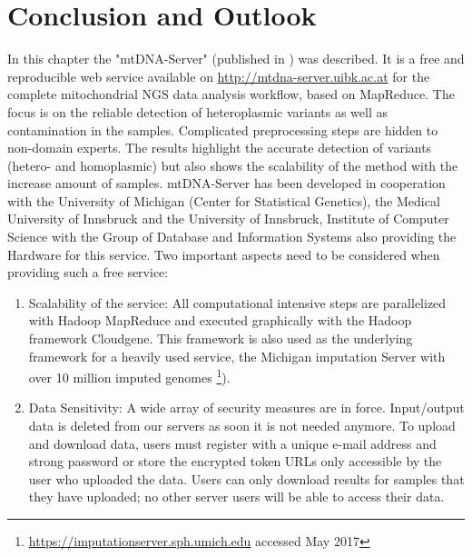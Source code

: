\section{Conclusion and Outlook}
In this chapter the "mtDNA-Server" (published in \cite{Weissensteiner2016b}) was described. It is a free and reproducible web service available on \url{http://mtdna-server.uibk.ac.at} for the complete mitochondrial NGS data analysis workflow, based on MapReduce. The focus is on the reliable detection of heteroplasmic variants as well as contamination in the samples. Complicated preprocessing steps are hidden to non-domain experts. The results highlight the accurate detection of variants (hetero- and homoplasmic) but also shows the scalability of the method with the increase amount of samples. mtDNA-Server has been developed in cooperation with the University of Michigan (Center for Statistical Genetics), the Medical University of Innsbruck and the University of Innsbruck, Institute of Computer Science with the Group of Database and Information Systems also providing the Hardware for this service.
Two important aspects need to be considered when providing such a free service:
\begin{enumerate}
\item Scalability of the service: All computational intensive steps are parallelized with Hadoop MapReduce and executed graphically with the Hadoop framework Cloudgene. This framework is also used as the underlying framework for a heavily used service, the Michigan imputation Server \cite{Das2016} with over 10 million imputed genomes \footnote{\url{https://imputationserver.sph.umich.edu} accessed May 2017}).
\item Data Sensitivity: A wide array of security measures are in force. Input/output data is deleted from our servers as soon it is not needed anymore. To upload and download data, users must register with a unique e-mail address and strong password or store the encrypted token URLs only accessible by the user who uploaded the data. Users can only download results for samples that they have uploaded; no other server users will be able to access their data.
\end{enumerate}

